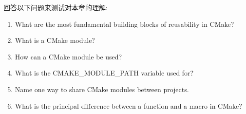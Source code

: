 回答以下问题来测试对本章的理解:

\begin{enumerate}
\item 
What are the most fundamental building blocks of reusability in CMake?

\item 
What is a CMake module?

\item 
How can a CMake module be used?

\item 
What is the CMAKE\_MODULE\_PATH variable used for?

\item 
Name one way to share CMake modules between projects.

\item 
What is the principal difference between a function and a macro in CMake?
\end{enumerate}